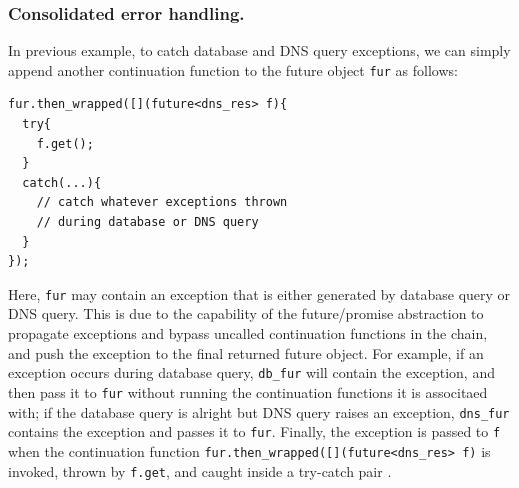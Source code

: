 

\subsubsection{Consolidated error handling.}
\label{sec:consolidated-error-handling}
In previous example, to catch database and DNS query exceptions, we can simply append another continuation function to the future object \lstinline[style=InlineStyle]{fur} as follows:

\vspace{-1mm}
\begin{lstlisting}[style=InlineStyle]
fur.then_wrapped([](future<dns_res> f){
  try{
    f.get();
  }
  catch(...){
    // catch whatever exceptions thrown
    // during database or DNS query
  }
});
\end{lstlisting}
\vspace{-1mm}

\noindent Here, \lstinline[style=InlineStyle]{fur} may contain an exception that is either generated by database query or DNS query. This is due to the capability of the future/promise abstraction to propagate exceptions and bypass uncalled continuation functions in the chain, and push the exception to the final returned future object. For example, if an exception occurs during database query, \lstinline[style=InlineStyle]{db_fur} will contain the exception, and then pass it to \lstinline[style=InlineStyle]{fur} without running the continuation functions it is associtaed with; if the database query is alright but DNS query raises an exception, \lstinline[style=InlineStyle]{dns_fur} contains the exception and passes it to \lstinline[style=InlineStyle]{fur}. Finally, the exception is passed to \lstinline[style=InlineStyle]{f} when the continuation function \lstinline[style=InlineStyle]{fur.then_wrapped([](future<dns_res> f)} is invoked, thrown by \lstinline[style=InlineStyle]{f.get}, and caught inside a try-catch pair \cite{cppexception}.

